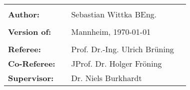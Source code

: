 





\vfil

\begin{flushleft}
\begin{tabular}{llll}
& & \\
\textbf{Author:} & & Sebastian Wittka BEng. &
\\
& & \\
\textbf{Version of:} & & Mannheim, \today &\\
& & \\
\textbf{Referee:} & & Prof. Dr.-Ing. Ulrich Brüning &\\
\textbf{Co-Referee:} & & JProf. Dr. Holger Fröning &\\
\textbf{Supervisor:} & & Dr. Niels Burkhardt &\\
\end{tabular}
\end{flushleft}